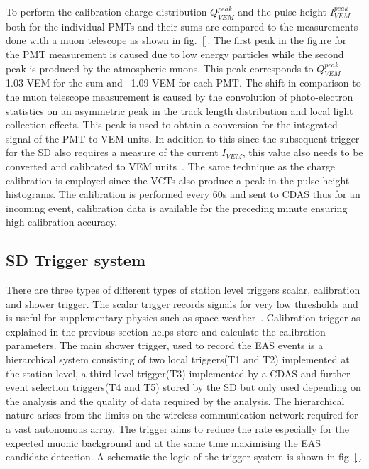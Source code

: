 To perform the calibration charge distribution $Q_{VEM}^{peak}$ and the pulse height $I_{VEM}^{peak}$ both for the individual PMTs and their sums are compared to the measurements done with a muon telescope as shown in fig.~\ref{}. The first peak in the figure for the PMT measurement is caused due to low energy particles while the second peak is produced by the atmospheric muons. This peak corresponds to $Q_{VEM}^{peak}$~ 1.03 VEM for the sum and ~1.09 VEM for each PMT. The shift in comparison to the muon telescope measurement is caused by the convolution of photo-electron statistics on an asymmetric peak in the track length distribution and local light
collection effects. This peak is used to obtain a conversion for the integrated signal of the PMT to VEM units. In addition to this since the subsequent trigger for the SD also requires a measure of the current $I_{VEM}$, this value also needs to be converted and calibrated to VEM units~\cite{}. The same technique as the charge calibration is employed since the VCTs also produce a peak in the pulse height histograms. The calibration is performed every 60s and sent to CDAS thus for an incoming event, calibration data is available for the preceding minute ensuring high calibration accuracy. 

\subsection*{SD Trigger system}
\label{sec:Sur_det_trig}
There are three types of different types of station level triggers scalar, calibration and shower trigger. The scalar trigger records signals for very low thresholds and is useful for supplementary physics such as space weather~\cite{}. Calibration trigger as explained in the previous section helps store and calculate the calibration parameters. The main shower trigger, used to record the EAS events is a hierarchical system consisting of two local triggers(T1 and T2) implemented at the station level, a third level trigger(T3) implemented by a CDAS and further event selection triggers(T4 and T5) stored by the SD but only used depending on the analysis and the quality of data required by the analysis. The hierarchical nature arises from the limits on the wireless communication network required for a vast autonomous array. The trigger aims to reduce the rate especially for the expected muonic background and at the same time maximising the EAS candidate detection. A schematic the logic of the trigger system is shown in fig~\ref{}. 


